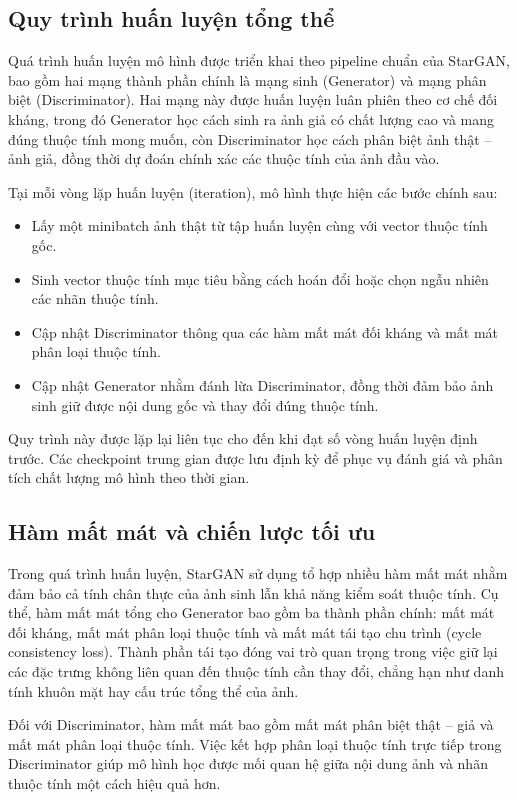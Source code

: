 \documentclass[../DoAn.tex]{subfiles}
\begin{document}
\subsection{Quy trình huấn luyện tổng thể}

Quá trình huấn luyện mô hình được triển khai theo pipeline chuẩn của StarGAN, bao gồm hai mạng thành phần chính là mạng sinh (Generator) và mạng phân biệt (Discriminator). Hai mạng này được huấn luyện luân phiên theo cơ chế đối kháng, trong đó Generator học cách sinh ra ảnh giả có chất lượng cao và mang đúng thuộc tính mong muốn, còn Discriminator học cách phân biệt ảnh thật – ảnh giả, đồng thời dự đoán chính xác các thuộc tính của ảnh đầu vào.

Tại mỗi vòng lặp huấn luyện (iteration), mô hình thực hiện các bước chính sau:
\begin{itemize}
    \item Lấy một minibatch ảnh thật từ tập huấn luyện cùng với vector thuộc tính gốc.
    \item Sinh vector thuộc tính mục tiêu bằng cách hoán đổi hoặc chọn ngẫu nhiên các nhãn thuộc tính.
    \item Cập nhật Discriminator thông qua các hàm mất mát đối kháng và mất mát phân loại thuộc tính.
    \item Cập nhật Generator nhằm đánh lừa Discriminator, đồng thời đảm bảo ảnh sinh giữ được nội dung gốc và thay đổi đúng thuộc tính.
\end{itemize}

Quy trình này được lặp lại liên tục cho đến khi đạt số vòng huấn luyện định trước. Các checkpoint trung gian được lưu định kỳ để phục vụ đánh giá và phân tích chất lượng mô hình theo thời gian.

\subsection{Hàm mất mát và chiến lược tối ưu}

Trong quá trình huấn luyện, StarGAN sử dụng tổ hợp nhiều hàm mất mát nhằm đảm bảo cả tính chân thực của ảnh sinh lẫn khả năng kiểm soát thuộc tính. Cụ thể, hàm mất mát tổng cho Generator bao gồm ba thành phần chính: mất mát đối kháng, mất mát phân loại thuộc tính và mất mát tái tạo chu trình (cycle consistency loss). Thành phần tái tạo đóng vai trò quan trọng trong việc giữ lại các đặc trưng không liên quan đến thuộc tính cần thay đổi, chẳng hạn như danh tính khuôn mặt hay cấu trúc tổng thể của ảnh.

Đối với Discriminator, hàm mất mát bao gồm mất mát phân biệt thật – giả và mất mát phân loại thuộc tính. Việc kết hợp phân loại thuộc tính trực tiếp trong Discriminator giúp mô hình học được mối quan hệ giữa nội dung ảnh và nhãn thuộc tính một cách hiệu quả hơn.
\end{document}
